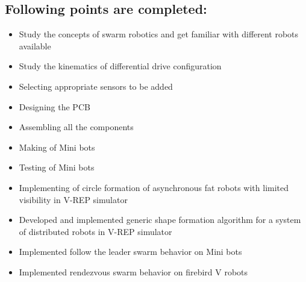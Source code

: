 \documentclass[a4paper,12pt,oneside]{book}
\begin{document}
\subsection*{Following points are completed:}
\begin{itemize}
\item Study the concepts of swarm robotics and get familiar
with different robots available \\
\item Study the kinematics of differential drive configuration \\
\item Selecting appropriate sensors to be added \\
\item Designing the PCB \\
\item Assembling all the components \\
\item Making of Mini bots \\
\item Testing of Mini bots\\
\item Implementing of circle formation of asynchronous fat robots with limited visibility in V-REP simulator\\
\item Developed and implemented generic shape formation algorithm for a system of distributed robots in V-REP simulator\\
\item Implemented follow the leader swarm behavior on Mini bots\\
\item Implemented rendezvous swarm behavior on firebird V robots\\
\end{itemize}
\end{document}
